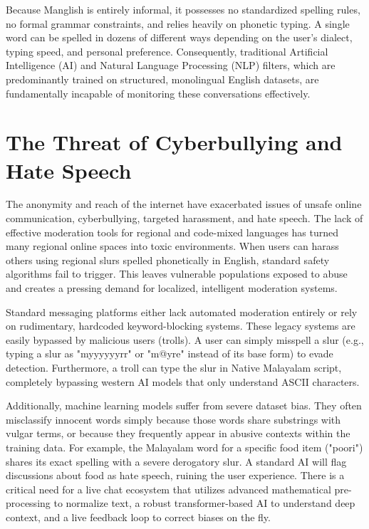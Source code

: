 \documentclass[12pt,a4paper]{report}
\begin{document}
Because Manglish is entirely informal, it possesses no standardized spelling rules, no formal grammar constraints, and relies heavily on phonetic typing. A single word can be spelled in dozens of different ways depending on the user's dialect, typing speed, and personal preference. Consequently, traditional Artificial Intelligence (AI) and Natural Language Processing (NLP) filters, which are predominantly trained on structured, monolingual English datasets, are fundamentally incapable of monitoring these conversations effectively. 

\section{The Threat of Cyberbullying and Hate Speech}
The anonymity and reach of the internet have exacerbated issues of unsafe online communication, cyberbullying, targeted harassment, and hate speech. The lack of effective moderation tools for regional and code-mixed languages has turned many regional online spaces into toxic environments. When users can harass others using regional slurs spelled phonetically in English, standard safety algorithms fail to trigger. This leaves vulnerable populations exposed to abuse and creates a pressing demand for localized, intelligent moderation systems.

Standard messaging platforms either lack automated moderation entirely or rely on rudimentary, hardcoded keyword-blocking systems. These legacy systems are easily bypassed by malicious users (trolls). A user can simply misspell a slur (e.g., typing a slur as "myyyyyyrr" or "m@yre" instead of its base form) to evade detection. Furthermore, a troll can type the slur in Native Malayalam script, completely bypassing western AI models that only understand ASCII characters. 

Additionally, machine learning models suffer from severe dataset bias. They often misclassify innocent words simply because those words share substrings with vulgar terms, or because they frequently appear in abusive contexts within the training data. For example, the Malayalam word for a specific food item ("poori") shares its exact spelling with a severe derogatory slur. A standard AI will flag discussions about food as hate speech, ruining the user experience. There is a critical need for a live chat ecosystem that utilizes advanced mathematical pre-processing to normalize text, a robust transformer-based AI to understand deep context, and a live feedback loop to correct biases on the fly.
\end{document}
